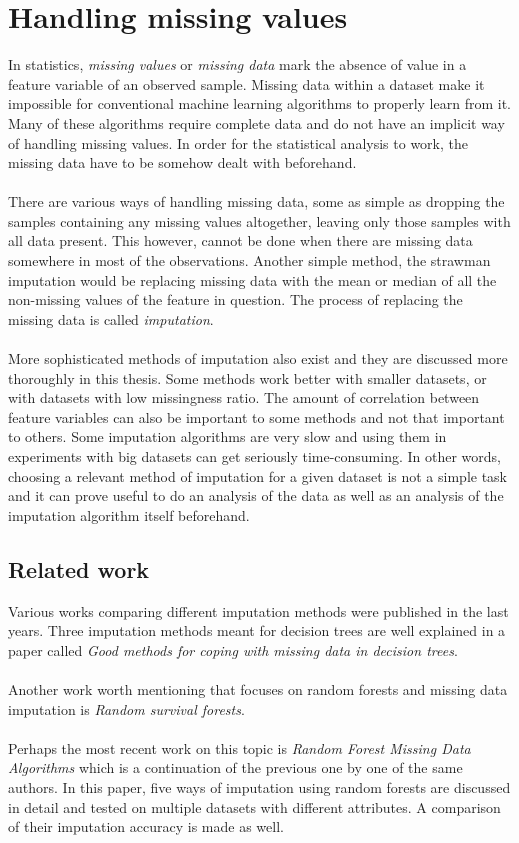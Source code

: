 \documentclass[11pt]{article}
\begin{document}
  \section{Handling missing values}
    In statistics, {\it missing values} or {\it missing data} mark the absence of value in a feature variable of an observed sample. Missing data within a dataset make it impossible for conventional machine learning algorithms to properly learn from it. Many of these algorithms require complete data and do not have an implicit way of handling missing values. In order for the statistical analysis to work, the missing data have to be somehow dealt with beforehand. \cite{otfi}
    \\~\\
    There are various ways of handling missing data, some as simple as dropping the samples containing any missing values altogether, leaving only those samples with all data present. \cite{lwd} This however, cannot be done when there are missing data somewhere in most of the observations. Another simple method, the strawman imputation \cite{otfi} would be replacing missing data with the mean or median of all the non-missing values of the feature in question. The process of replacing the missing data is called {\it imputation}.
    \\~\\
    More sophisticated methods of imputation also exist and they are discussed more thoroughly in this thesis. Some methods work better with smaller datasets, or with datasets with low missingness ratio. The amount of correlation between feature variables can also be important to some methods and not that important to others. \cite{otfi} Some imputation algorithms are very slow and using them in experiments with big datasets can get seriously time-consuming. In other words, choosing a relevant method of imputation for a given dataset is not a simple task and it can prove useful to do an analysis of the data as well as an analysis of the imputation algorithm itself beforehand.
    \subsection{Related work}
      Various works comparing different imputation methods were published in the last years. Three imputation methods meant for decision trees are well explained in a paper called {\it Good methods for coping with missing data in decision trees}. \cite{mia}
      \\~\\
      Another work worth mentioning that focuses on random forests and missing data imputation is {\it Random survival forests}. \cite{rsf}
      \\~\\
      Perhaps the most recent work on this topic is {\it Random Forest Missing Data Algorithms} \cite{otfi} which is a continuation of the previous one by one of the same authors. In this paper, five ways of imputation using random forests are discussed in detail and tested on multiple datasets with different attributes. A comparison of their imputation accuracy is made as well.
    \\~\\
\end{document}

